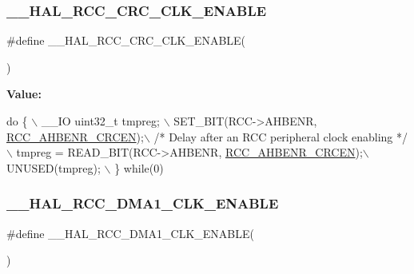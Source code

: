 \subsubsection{\texorpdfstring{\+\_\+\+\_\+\+H\+A\+L\+\_\+\+R\+C\+C\+\_\+\+C\+R\+C\+\_\+\+C\+L\+K\+\_\+\+E\+N\+A\+B\+LE}{\_\_HAL\_RCC\_CRC\_CLK\_ENABLE}}
{\footnotesize\ttfamily \#define \+\_\+\+\_\+\+H\+A\+L\+\_\+\+R\+C\+C\+\_\+\+C\+R\+C\+\_\+\+C\+L\+K\+\_\+\+E\+N\+A\+B\+LE(\begin{DoxyParamCaption}{ }\end{DoxyParamCaption})}

{\bfseries Value\+:}
\begin{DoxyCode}
\textcolor{keywordflow}{do} \{ \(\backslash\)
                                        \_\_IO uint32\_t tmpreg; \(\backslash\)
                                        SET\_BIT(RCC->AHBENR, \hyperlink{group___peripheral___registers___bits___definition_gade3ee302bf659a2bfbf75e1a00630242}{RCC\_AHBENR\_CRCEN});\(\backslash\)
                                        \textcolor{comment}{/* Delay after an RCC peripheral clock enabling */}\(\backslash\)
                                        tmpreg = READ\_BIT(RCC->AHBENR, 
      \hyperlink{group___peripheral___registers___bits___definition_gade3ee302bf659a2bfbf75e1a00630242}{RCC\_AHBENR\_CRCEN});\(\backslash\)
                                        UNUSED(tmpreg); \(\backslash\)
                                      \} \textcolor{keywordflow}{while}(0)
\end{DoxyCode}
\mbox{\label{group___r_c_c___a_h_b___clock___enable___disable_ga49fc2c82ba0753e462ea8eb91c634a98}} 
\subsubsection{\texorpdfstring{\+\_\+\+\_\+\+H\+A\+L\+\_\+\+R\+C\+C\+\_\+\+D\+M\+A1\+\_\+\+C\+L\+K\+\_\+\+E\+N\+A\+B\+LE}{\_\_HAL\_RCC\_DMA1\_CLK\_ENABLE}}
{\footnotesize\ttfamily \#define \+\_\+\+\_\+\+H\+A\+L\+\_\+\+R\+C\+C\+\_\+\+D\+M\+A1\+\_\+\+C\+L\+K\+\_\+\+E\+N\+A\+B\+LE(\begin{DoxyParamCaption}{ }\end{DoxyParamCaption})}

